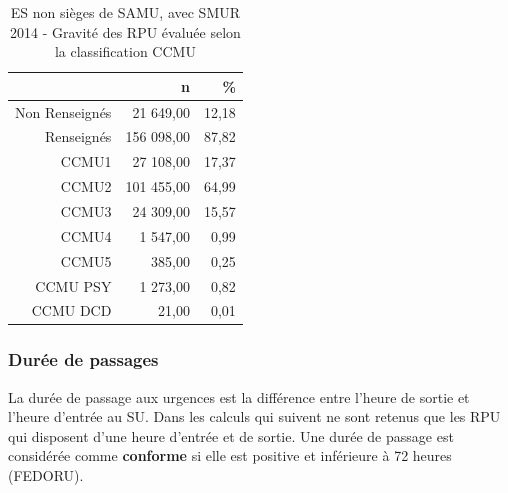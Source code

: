 \documentclass[]{article}
\begin{document}
\begin{itemize}
  \begin{table}[ht]
  \centering
  \begin{tabular}{rrr}
    \hline
   & n & \% \\ 
    \hline
  Non Renseignés & 21 649,00 & 12,18 \\ 
    Renseignés & 156 098,00 & 87,82 \\ 
    CCMU1 & 27 108,00 & 17,37 \\ 
    CCMU2 & 101 455,00 & 64,99 \\ 
    CCMU3 & 24 309,00 & 15,57 \\ 
    CCMU4 & 1 547,00 & 0,99 \\ 
    CCMU5 & 385,00 & 0,25 \\ 
    CCMU PSY & 1 273,00 & 0,82 \\ 
    CCMU DCD & 21,00 & 0,01 \\ 
     \hline
  \end{tabular}
  \caption{ES non sièges de SAMU, avec SMUR 2014 - Gravité des RPU évaluée selon la classification CCMU} 
  \end{table}
\end{itemize}

\subsubsection{Durée de passages}\label{duree-de-passages-2}

La durée de passage aux urgences est la différence entre l'heure de
sortie et l'heure d'entrée au SU. Dans les calculs qui suivent ne sont
retenus que les RPU qui disposent d'une heure d'entrée et de sortie. Une
durée de passage est considérée comme \textbf{conforme} si elle est
positive et inférieure à 72 heures (FEDORU).
\end{document}
